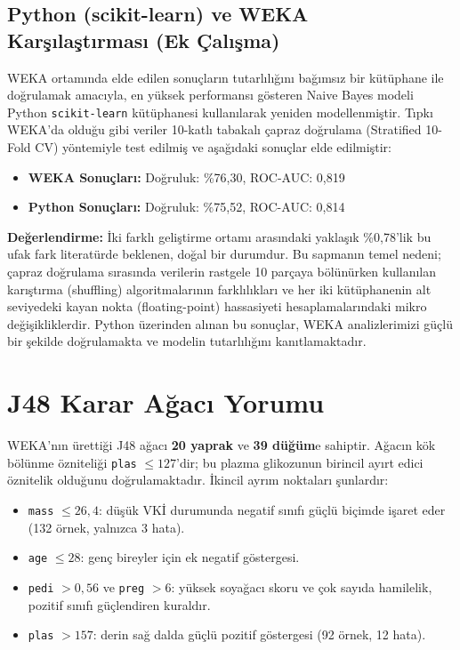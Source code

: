 \documentclass[12pt,a4paper]{article}
\begin{document}
\subsection{Python (scikit-learn) ve WEKA Karşılaştırması (Ek Çalışma)}

WEKA ortamında elde edilen sonuçların tutarlılığını bağımsız bir kütüphane ile doğrulamak amacıyla, en yüksek performansı gösteren Naive Bayes modeli Python \texttt{scikit-learn} kütüphanesi kullanılarak yeniden modellenmiştir. Tıpkı WEKA'da olduğu gibi veriler 10-katlı tabakalı çapraz doğrulama (Stratified 10-Fold CV) yöntemiyle test edilmiş ve aşağıdaki sonuçlar elde edilmiştir:

\begin{itemize}
  \item \textbf{WEKA Sonuçları:} Doğruluk: \%76{,}30, ROC-AUC: 0{,}819
  \item \textbf{Python Sonuçları:} Doğruluk: \%75{,}52, ROC-AUC: 0{,}814
\end{itemize}

\textbf{Değerlendirme:} İki farklı geliştirme ortamı arasındaki yaklaşık \%0{,}78'lik bu ufak fark literatürde beklenen, doğal bir durumdur. Bu sapmanın temel nedeni; çapraz doğrulama sırasında verilerin rastgele 10 parçaya bölünürken kullanılan karıştırma (shuffling) algoritmalarının farklılıkları ve her iki kütüphanenin alt seviyedeki kayan nokta (floating-point) hassasiyeti hesaplamalarındaki mikro değişikliklerdir. Python üzerinden alınan bu sonuçlar, WEKA analizlerimizi güçlü bir şekilde doğrulamakta ve modelin tutarlılığını kanıtlamaktadır.

\section{J48 Karar Ağacı Yorumu}

WEKA'nın ürettiği J48 ağacı \textbf{20 yaprak} ve \textbf{39 düğüm}e sahiptir.
Ağacın kök bölünme özniteliği \texttt{plas} $\leq 127$'dir; bu plazma
glikozunun birincil ayırt edici öznitelik olduğunu doğrulamaktadır.
İkincil ayrım noktaları şunlardır:

\begin{itemize}
  \item \texttt{mass} $\leq 26{,}4$: düşük VKİ durumunda negatif sınıfı güçlü
        biçimde işaret eder (132 örnek, yalnızca 3 hata).
  \item \texttt{age} $\leq 28$: genç bireyler için ek negatif göstergesi.
  \item \texttt{pedi} $> 0{,}56$ ve \texttt{preg} $> 6$: yüksek soyağacı skoru
        ve çok sayıda hamilelik, pozitif sınıfı güçlendiren kuraldır.
  \item \texttt{plas} $> 157$: derin sağ dalda güçlü pozitif göstergesi
        (92 örnek, 12 hata).
\end{itemize}
\end{document}
